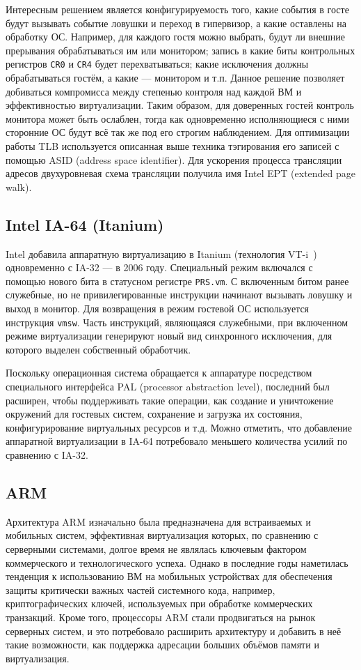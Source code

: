 Интересным решением является конфигурируемость того, какие события в госте будут вызывать событие ловушки и переход в гипервизор, а какие оставлены на обработку ОС. Например, для каждого гостя можно выбрать, будут ли внешние прерывания обрабатываться им или монитором; запись в какие биты контрольных регистров \texttt{CR0} и \texttt{CR4} будет перехватываться; какие исключения должны обрабатываться гостём, а какие --- монитором и т.п. Данное решение позволяет добиваться компромисса между степенью контроля над каждой ВМ и эффективностью виртуализации. Таким образом, для доверенных гостей контроль монитора может быть ослаблен, тогда как одновременно исполняющиеся с ними сторонние ОС будут всё так же под его строгим наблюдением. Для оптимизации работы TLB используется описанная выше техника тэгирования его записей с помощью ASID (\abbr address space identifier). Для ускорения процесса трансляции адресов двухуровневая схема трансляции получила имя Intel EPT (\abbr extended page walk).

\subsection{Intel IA-64 (Itanium)}

Intel добавила аппаратную виртуализацию в Itanium (технология VT-i~\cite{vtx}) одновременно с IA-32 --- в 2006 году. Специальный режим включался с помощью нового бита в статусном регистре \texttt{PRS.vm}. С включенным битом ранее служебные, но не привилегированные инструкции начинают вызывать ловушку и выход в монитор. Для возвращения в режим гостевой ОС используется инструкция \texttt{vmsw}. Часть инструкций, являющаяся служебными, при включенном режиме виртуализации генерируют новый вид синхронного исключения, для которого выделен собственный обработчик.

Поскольку операционная система обращается к аппаратуре посредством специального интерфейса PAL (\abbr processor abstraction level), последний был расширен, чтобы поддерживать такие операции, как создание и уничтожение окружений для гостевых систем, сохранение и загрузка их состояния, конфигурирование виртуальных ресурсов и т.д. Можно отметить, что добавление аппаратной виртуализации в IA-64 потребовало меньшего количества усилий по сравнению с IA-32.

\subsection{ARM}

Архитектура ARM изначально была предназначена для встраиваемых и мобильных систем, эффективная виртуализация которых, по сравнению с серверными системами, долгое время не являлась ключевым фактором коммерческого и технологического успеха. Однако в последние годы наметилась тенденция к использованию ВМ на мобильных устройствах для обеспечения защиты критически важных частей системного кода, например, криптографических ключей, используемых при обработке коммерческих транзакций. Кроме того, процессоры ARM стали продвигаться на рынок серверных систем, и это потребовало расширить архитектуру и добавить в неё такие возможности, как поддержка адресации больших объёмов памяти и виртуализация.

